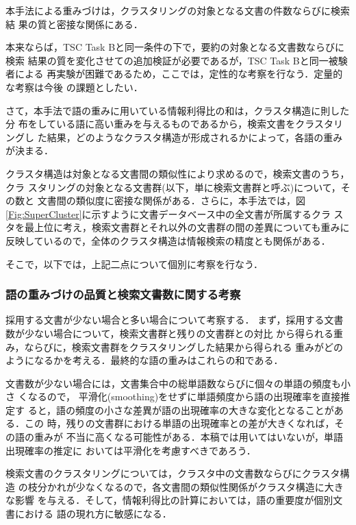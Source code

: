 本手法による重みづけは，クラスタリングの対象となる文書の件数ならびに検索結
果の質と密接な関係にある．

本来ならば，TSC Task Bと同一条件の下で，要約の対象となる文書数ならびに検索
結果の質を変化させての追加検証が必要であるが，TSC Task Bと同一被験者による
再実験が困難であるため，ここでは，定性的な考察を行なう．定量的な考察は今後
の課題としたい．

さて，本手法で語の重みに用いている情報利得比の和は，クラスタ構造に則した分
布をしている語に高い重みを与えるものであるから，検索文書をクラスタリングし
た結果，どのようなクラスタ構造が形成されるかによって，各語の重みが決まる．

クラスタ構造は対象となる文書間の類似性により求めるので，検索文書のうち，クラ
スタリングの対象となる文書群(以下，単に検索文書群と呼ぶ)について，その数と
文書間の類似度に密接な関係がある．さらに，本手法では，図
\ref{Fig:SuperCluster}に示すように文書データベース中の全文書が所属するクラ
スタを最上位に考え，検索文書群とそれ以外の文書群の間の差異についても重みに
反映しているので，全体のクラスタ構造は情報検索の精度とも関係がある．

そこで，以下では，上記二点について個別に考察を行なう．


\subsubsection{語の重みづけの品質と検索文書数に関する考察}
\label{Sec:語の重みづけの品質と検索文書数に関する考察}

採用する文書が少ない場合と多い場合について考察する．
まず，採用する文書数が少ない場合について，検索文書群と残りの文書群との対比
から得られる重み，ならびに，検索文書群をクラスタリングした結果から得られる
重みがどのようになるかを考える．最終的な語の重みはこれらの和である．

文書数が少ない場合には，文書集合中の総単語数ならびに個々の単語の頻度も小さ
くなるので， 平滑化(smoothing)をせずに単語頻度から語の出現確率を直接推定す
ると，語の頻度の小さな差異が語の出現確率の大きな変化となることがある．この
時，残りの文書群における単語の出現確率との差が大きくなれば，その語の重みが
不当に高くなる可能性がある．本稿では用いてはいないが，単語出現確率の推定に
おいては平滑化を考慮すべきであろう．

検索文書のクラスタリングについては，クラスタ中の文書数ならびにクラスタ構造
の枝分かれが少なくなるので，各文書間の類似性関係がクラスタ構造に大きな影響
を与える．そして，情報利得比の計算においては，語の重要度が個別文書における
語の現れ方に敏感になる．
           

